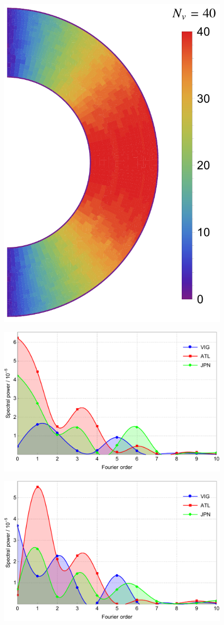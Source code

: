 \documentclass[extra,referee]{gji}
\begin{document}
\begin{figure}
\begin{minipage}{0.4\textwidth}
    \label{fig:s2nv}\par \medskip \vfill
    \includegraphics[height=.9\textwidth]{fig/model/s4nv.pdf} 
    \label{fig:s4nv}\par \medskip \vfill
  \end{minipage}%
  \begin{minipage}{0.6\textwidth}
    \centering
    \includegraphics[height=.6\textwidth]{fig/model/s3pow.pdf} 
    \label{fig:s3pow}\par \medskip \vfill
    \includegraphics[height=.6\textwidth]{fig/model/s2pow.pdf} 

\end{minipage}
\end{figure}
\end{document}
